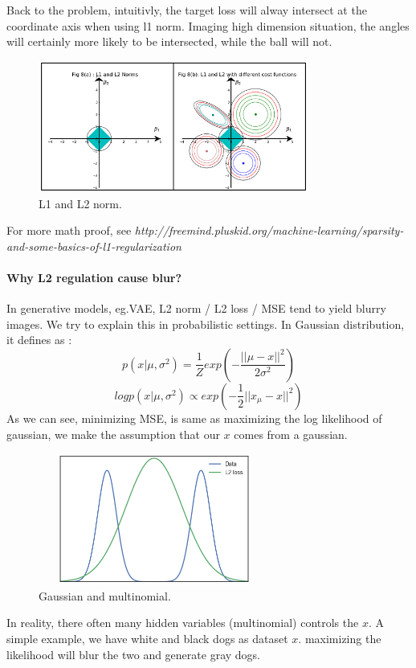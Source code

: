 \documentclass{article}
\begin{document}
Back to the problem, intuitivly, the target loss will alway intersect at the coordinate axis when using l1 norm. Imaging high dimension situation, the angles will certainly more likely to be intersected, while the ball will not.

\begin{figure}[H]
\centering
\includegraphics[width=3.5in,height=1.7in]{l1l2}
\caption{L1 and L2 norm.}
\end{figure}

For more math proof, see \textit{http://freemind.pluskid.org/machine-learning/sparsity-and-some-basics-of-l1-regularization}

\paragraph{Why L2 regulation cause blur?}

In generative models, eg.VAE, L2 norm / L2 loss / MSE tend to yield blurry images. We try to explain this in probabilistic settings. In Gaussian distribution, it defines as :
$$p(x|\mu,\sigma^{2})=\frac{1}{Z}exp\left( -\frac{||\mu-x||^{2}}{2\sigma^{2}}\right)$$
$$logp(x|\mu,\sigma^{2}) \propto exp\left(-\frac{1}{2}||x_{\mu}-x||^{2}  \right)$$
As we can see, minimizing MSE, is same as maximizing the log likelihood of gaussian, we make the assumption that our $x$ comes from a gaussian.


\begin{figure}[H]
\centering
\includegraphics[width=3in,height=1.7in]{l2}
\caption{Gaussian and multinomial.}
\end{figure}

In reality, there often many hidden variables (multinomial) controls the $x$. A simple example, we have white and black dogs as dataset $x$. maximizing the likelihood will blur the two and generate gray dogs.
\end{document}
